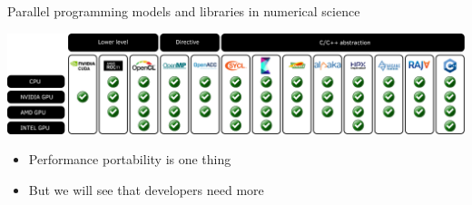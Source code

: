 \documentclass[
    aspectratio=169,
]{beamer}
\begin{document}

\begin{frame}{Parallel programming models and libraries in numerical science}
    \begin{center}
        \includegraphics[width=\textwidth]{prog_model.png}
    \end{center}
    \begin{itemize}
        \item Performance portability is one thing
        \item But we will see that developers need more
    \end{itemize}
\end{frame}

\end{document}
